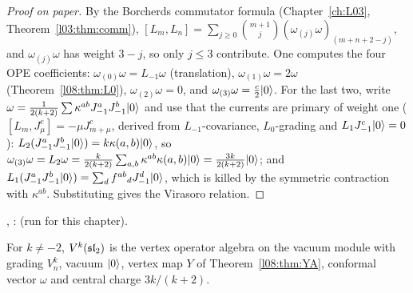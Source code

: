 \begin{proof}[Proof on paper]
By the Borcherds commutator formula (Chapter~\ref{ch:L03}, Theorem~\ref{l03:thm:comm}),
$[L_m,L_n] = \sum_{j\ge0}\binom{m+1}{j}(\omega_{(j)}\omega)_{(m+n+2-j)}$, and $\omega_{(j)}\omega$ has
weight $3-j$, so only $j\le3$ contribute. One computes the four OPE coefficients:
$\omega_{(0)}\omega = L_{-1}\omega$ (translation), $\omega_{(1)}\omega = 2\omega$ (Theorem~\ref{l08:thm:L0}),
$\omega_{(2)}\omega = 0$, and $\omega_{(3)}\omega = \frac c2|0\rangle$. For the last two, write
$\omega = \frac1{2(k+2)}\sum\kappa^{ab}J^a_{-1}J^b_{-1}|0\rangle$ and use that the currents are
primary of weight one ($[L_m,J^c_\mu] = -\mu J^c_{m+\mu}$, derived from $L_{-1}$-covariance,
$L_0$-grading and $L_1J^c_{-1}|0\rangle = 0$): $L_2(J^a_{-1}J^b_{-1}|0\rangle) = k\kappa(a,b)|0\rangle$, so
$\omega_{(3)}\omega = L_2\omega = \frac{k}{2(k+2)}\sum_{a,b}\kappa^{ab}\kappa(a,b)|0\rangle
= \frac{3k}{2(k+2)}|0\rangle$; and $L_1(J^a_{-1}J^b_{-1}|0\rangle) = \sum_df^{ab}{}_dJ^d_{-1}|0\rangle$,
which is killed by the symmetric contraction with $\kappa^{ab}$. Substituting gives the Virasoro
relation.
\end{proof}

\begin{status}
\allowbreak{}\allowbreak{}\allowbreak{}\allowbreak{}, \allowbreak{}\allowbreak{}\allowbreak{}\allowbreak{}:
\lean{[propext, Classical.}\allowbreak{}\allowbreak\lean{sound]} (run for this chapter).
\end{status}

\begin{definition}\label{l08:def:Vk}
For $k\ne-2$, $V^k(\mathfrak{sl}_2)$ is the vertex operator algebra on the vacuum module with grading
$V^k_n$, vacuum $|0\rangle$, vertex map $Y$ of Theorem~\ref{l08:thm:YA}, conformal vector $\omega$ and
central charge $3k/(k+2)$.
\end{definition}

